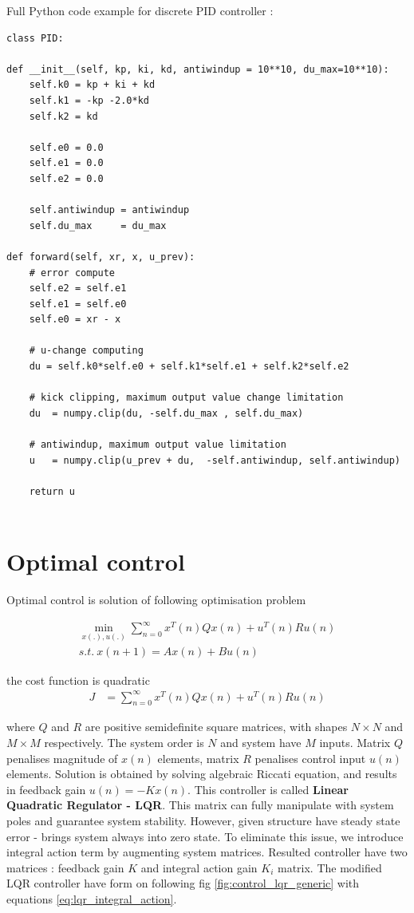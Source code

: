\documentclass[12pt,twoside,onecolumn,openany,extrafontsizes,dvipsnames]{memoir}
\begin{document}
                Full Python code example for discrete PID controller :
                \begin{lstlisting}[style=python_style]
class PID:

def __init__(self, kp, ki, kd, antiwindup = 10**10, du_max=10**10):
    self.k0 = kp + ki + kd
    self.k1 = -kp -2.0*kd
    self.k2 = kd

    self.e0 = 0.0
    self.e1 = 0.0
    self.e2 = 0.0
    
    self.antiwindup = antiwindup
    self.du_max     = du_max

def forward(self, xr, x, u_prev):
    # error compute
    self.e2 = self.e1
    self.e1 = self.e0
    self.e0 = xr - x

    # u-change computing
    du = self.k0*self.e0 + self.k1*self.e1 + self.k2*self.e2

    # kick clipping, maximum output value change limitation
    du  = numpy.clip(du, -self.du_max , self.du_max)

    # antiwindup, maximum output value limitation
    u   = numpy.clip(u_prev + du,  -self.antiwindup, self.antiwindup)

    return u


                \end{lstlisting}


    \newpage
    \section{Optimal control}

                
        Optimal control is solution of following optimisation problem

        \begin{align}
            \min_{x(.), u(.)} \sum_{n=0}^\infty x^T(n)Qx(n) + u^T(n)Ru(n) \\
            s.t.\ x(n+1) = Ax(n) + Bu(n)
        \end{align}

        the cost function is quadratic
        \begin{align}
            J &= \sum_{n=0}^\infty x^T(n)Qx(n) + u^T(n)Ru(n)
        \end{align}

        where $Q$ and $R$ are positive semidefinite square matrices, with shapes $N \times N$ and $M \times M$ respectively.
        The system order is $N$ and system have $M$ inputs.
        Matrix $Q$ penalises magnitude of $x(n)$ elements, matrix $R$ penalises control input $u(n)$ elements.
        Solution is obtained by solving algebraic Riccati equation, and results in feedback gain $u(n) = -Kx(n)$.
        This controller is called \textbf{Linear Quadratic Regulator - LQR}.
        This matrix can fully manipulate with system poles and guarantee system stability.
        However, given structure have steady state error - brings system always into zero state.
        To eliminate this issue, we introduce integral action term by augmenting system matrices. 
        Resulted controller have two matrices : feedback gain $K$ and integral action gain $K_i$ matrix.
        The modified LQR controller have form on following fig \ref{fig:control_lqr_generic} 
        with equations \ref{eq:lqr_integral_action}.
\end{document}
